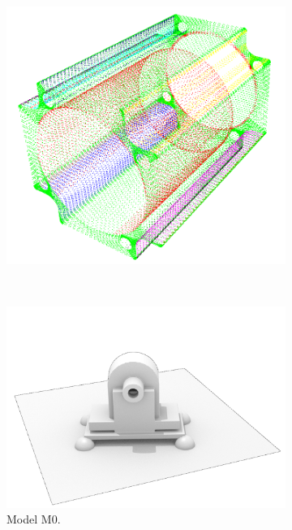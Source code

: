 \begin{figure}
\begin{subfigure}[b]{0.21\linewidth}
		\includegraphics[width=\textwidth]{figures/m3_pc.png}
	\end{subfigure}	 
	\\
	\begin{subfigure}[b]{0.21\linewidth}
		\centering
		\includegraphics[width=\textwidth]{figures/m0_rendering_wo.png}
		\caption{Model M$0$.}
	\end{subfigure}	 
	\begin{subfigure}[b]{0.21\linewidth}
		\centering

\end{subfigure}
\end{figure}
